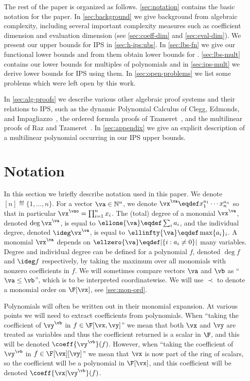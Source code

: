 \documentclass[11pt]{article}
\numberwithin{equation}{section}
\theoremstyle{definition}
\theoremstyle{plain}
\newcommand{\N}{\mathbb N}
\begin{document}
The rest of the paper is organized as follows.
\autoref{sec:notation} contains the basic notation for the paper. In
\autoref{sec:background}
we give background from algebraic complexity, including several important complexity measures such as coefficient dimension and evaluation dimension
(see \autoref{sec:coeff-dim}
and \autoref{sec:eval-dim}). We present our upper bounds for IPS in \autoref{sec:h-ips:ubs}. In \autoref{sec:lbs-fn}
we give our functional lower bounds and from them obtain lower bounds for
\lIPS. \autoref{sec:lbs-mult}
contains our lower bounds for multiples of polynomials and in \autoref{sec:ips-mult} we derive lower bounds for IPS using them.  In
\autoref{sec:open-problems}
we list some problems which were left open by this work.

In \autoref{sec:alg-proofs} we describe various other algebraic proof systems and their relations to IPS, such as the dynamic Polynomial Calculus of Clegg, Edmonds, and Impagliazzo~\cite{CleggEI96}, the ordered formula proofs of Tzameret~\cite{Tzameret11}, and the multilinear proofs of Raz and Tzameret~\cite{RazTzameret08a}. In \autoref{sec:appendix} we give an explicit description of a multilinear polynomial occurring in our IPS upper bounds.

\section{Notation}\label{sec:notation}

In this section we briefly describe notation used in this paper. We denote $[n]\eqdef\{1,\ldots,n\}$.  For a vector $\va\in\N^n$, we denote $\vx^\va\eqdef x_1^{a_1}\cdots x_n^{a_n}$ so that in particular $\vx^\vno=\prod_{i=1}^n x_i$. The (total) degree of a monomial $\vx^\va$, denoted $\deg\vx^\va$, is equal to $\ellone{\va}\eqdef\sum_i a_i$, and the individual degree, denoted $\ideg \vx^\va$, is equal to $\ellinfty{\va}\eqdef\max\{a_i\}_i$. A monomial $\vx^\va$ depends on $\ellzero{\va}\eqdef|\{i:a_i\ne 0\}|$ many variables. Degree and individual degree can be defined for a polynomial $f$, denoted $\deg f$ and $\ideg f$ respectively, by taking the maximum over all monomials with nonzero coefficients in $f$. We will sometimes compare vectors $\va$ and $\vb$ as ``$\va\le\vb$'', which is to be interpreted
%
coordinatewise.  %
%
We will use $\prec$ to denote a monomial order on $\F[\vx]$, see \autoref{sec:mon-ord}.

Polynomials will often be written out in their monomial expansion.  At various points we will need to extract coefficients from polynomials.  When ``taking the coefficient of $\vy^\vb$ in $f\in\F[\vx,\vy]$'' we mean that both $\vx$ and $\vy$ are treated as variables and thus the coefficient returned is a scalar in $\F$, and this will be denoted $\coeff{\smash{\vy^\vb}}(f)$.  However, when ``taking the coefficient of $\vy^{\vb}$ in $f\in\F[\vx][\vy]$'' we mean that $\vx$ is now part of the ring of scalars, so the coefficient will be a polynomial in $\F[\vx]$, and this coefficient will be denoted $\coeff{\vx|\vy^\vb}(f)$.
\end{document}
